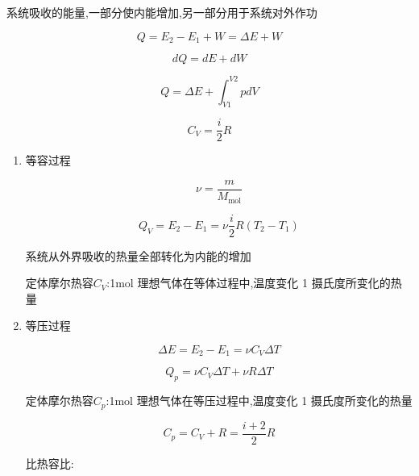 系统吸收的能量,一部分使内能增加,另一部分用于系统对外作功

\begin{equation}
    Q=E_2-E_1+W=\Delta{}E+W
\end{equation}

\begin{equation}
    dQ=dE+dW
\end{equation}

\begin{equation}
    Q=\Delta{E}+\int_{V1}^{V2}{pdV}
\end{equation}

\begin{equation}
    C_V=\frac{i}{2}R
\end{equation}

\begin{enumerate}

    \item 等容过程

          \begin{equation}
              \nu{}=\frac{m}{M_\mathrm{mol}}
          \end{equation}

          \begin{equation}
              Q_V=E_2-E_1=\nu{}\frac{i}{2}R(T_2-T_1)
          \end{equation}

          系统从外界吸收的热量全部转化为内能的增加

          定体摩尔热容$C_V$:1mol 理想气体在等体过程中,温度变化 1 摄氏度所变化的热量

    \item 等压过程

          \begin{equation}
              \Delta{}E=E_2-E_1=\nu{}C_V\Delta{T}
          \end{equation}

          \begin{equation}
              Q_p=\nu{}C_V\Delta{T}+\nu{}R\Delta{T}
          \end{equation}

          定体摩尔热容$C_p$:1mol 理想气体在等压过程中,温度变化 1 摄氏度所变化的热量

          \begin{equation}
              C_p=C_V+R=\frac{i+2}{2}R
          \end{equation}

          比热容比:


\end{enumerate}
